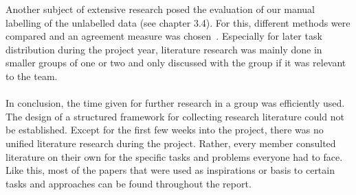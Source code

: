 Another subject of extensive research posed the evaluation of our manual labelling of the unlabelled data (see chapter 3.4). For this, different methods were compared and an agreement measure was chosen~\citep{mchugh2012interrater}. Especially for later task distribution during the project year, literature research was mainly done in smaller groups of one or two and only discussed with the group if it was relevant to the team. \\
\\
In conclusion, the time given for further research in a group was efficiently used. The design of a structured framework for collecting research literature could not be established. Except for the first few weeks into the project, there was no unified literature research during the project. Rather, every member consulted literature on their own for the specific tasks and problems everyone had to face. Like this, most of the papers that were used as inspirations or basis to certain tasks and approaches can be found throughout the report.

